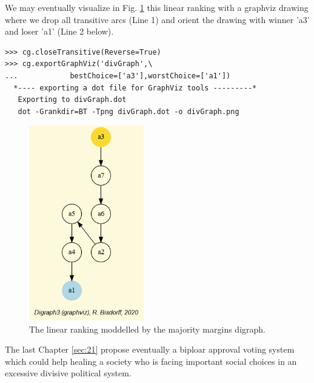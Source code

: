 We may eventually visualize in Fig. \ref{fig:20.2} this linear ranking with a graphviz drawing where we drop all transitive arcs (Line 1) and orient the drawing with \Condorcet winner 'a3' and loser 'a1' (Line 2 below).
\begin{lstlisting}
>>> cg.closeTransitive(Reverse=True)
>>> cg.exportGraphViz('divGraph',\
...            bestChoice=['a3'],worstChoice=['a1'])
  *---- exporting a dot file for GraphViz tools ---------*
   Exporting to divGraph.dot
   dot -Grankdir=BT -Tpng divGraph.dot -o divGraph.png
\end{lstlisting}
\begin{figure}[h]
\sidecaption
\includegraphics[width=5cm]{Figures/divGraph.png}
\caption{The linear ranking moddelled by the majority margins digraph.} 
\label{fig:20.2}       %
\end{figure}

The last Chapter \ref{sec:21} propose eventually a biploar approval voting system which could help healing a society who is facing important social choices in an excessive divisive political system.